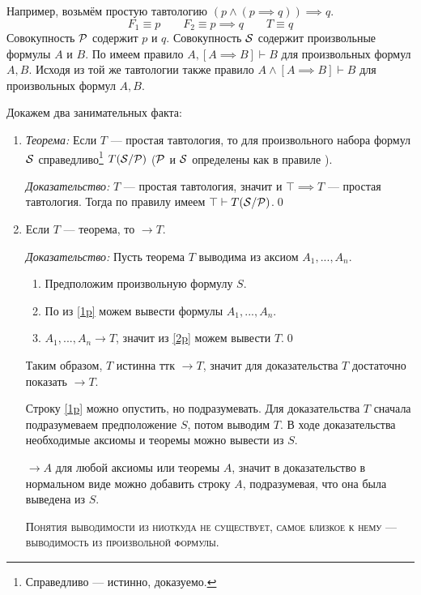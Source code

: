 Например, возьмём простую тавтологию $(p\land (p\implies q))\implies q$.
\[
	F_1\equiv p\qquad F_2\equiv p\implies q\qquad T\equiv q
\]
Совокупность $\mathcal P$ содержит $p$ и $q$.
Совокупность $\mathcal S$ содержит произвольные формулы $A$ и $B$.
По \taut{} имеем правило ${A,[A\implies B]\vdash B}$
для произвольных формул $A,B$.
Исходя из той же тавтологии также правило ${A\land[A\implies B]\vdash B}$
для произвольных формул $A,B$.

Докажем два занимательных факта:
\begin{enumerate}
	\item{}
	      {\it Теорема:}
	Если $T$ --- простая тавтология, то
	для произвольного набора формул $\mathcal S$ справедливо\footnote{
		Справедливо --- истинно, доказуемо.
	} $T(\mathcal S/\mathcal P)$
	($\mathcal P$ и $\mathcal S$ определены как в правиле \taut{}).

		{\it Доказательство:}
	$T$ --- простая тавтология, значит и
	${\top\implies T}$ --- простая тавтология. Тогда по правилу \taut{} имеем
	$\top\vdash T(\mathcal S/\mathcal P)$.\qed

	\item{}Если $T$ --- теорема, то $\to T$.

		{\it Доказательство:}
	Пусть теорема $T$ выводима из аксиом $A_1,...,A_{n}$.
	\begin{enumerate}[label=(\roman*)]
		\item{}\label{1p}Предположим произвольную формулу $S$.
		\item{}\label{2p}По \axiom{} из \ref{1p} можем вывести
		формулы $A_1,...,A_{n}$.
		\item{}\label{3p}$A_1,...,A_{n}\to T$, значит из \ref{2p} можем вывести $T$.\qed
	\end{enumerate}

	Таким образом, $T$ истинна ттк $\to T$, значит для доказательства $T$
	достаточно показать $\to T$.

	Строку \ref{1p} можно опустить, но подразумевать.
	Для доказательства $T$ сначала подразумеваем предположение $S$, потом
	выводим $T$. В ходе доказательства необходимые
	аксиомы и теоремы можно вывести из $S$.

	$\to A$ для любой аксиомы или теоремы $A$,
	значит в доказательство в нормальном виде
	можно добавить строку $A$, подразумевая, что она была выведена из $S$.

	\textsc{Понятия выводимости из ниоткуда не существует,
		самое близкое к нему --- выводимость из произвольной формулы.}
\end{enumerate}

